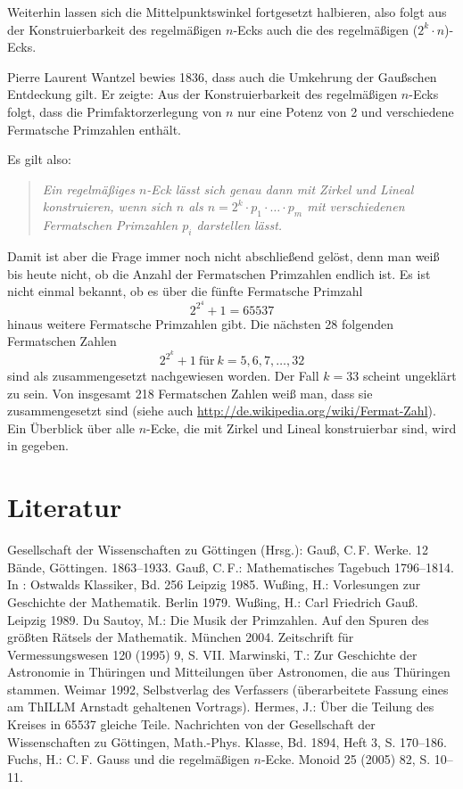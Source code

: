 \documentclass[10pt]{article}
\begin{document}
Weiterhin lassen sich die Mittelpunktswinkel fortgesetzt halbieren, also folgt
aus der Konstruierbarkeit des regelmäßigen $n$-Ecks auch die des  regelmäßigen
($2^k\cdot n$)-Ecks.

Pierre Laurent Wantzel bewies 1836, dass auch die Umkehrung der Gaußschen
Entdeckung gilt. Er zeigte: Aus der Konstruierbarkeit des
regelmäßigen $n$-Ecks folgt, dass die Primfaktorzerlegung von $n$ nur eine
Potenz von 2 und verschiedene Fermatsche Primzahlen enthält.

Es gilt also:
\begin{quote}\em
  Ein  regelmäßiges $n$-Eck lässt sich genau dann mit Zirkel und Lineal
  konstruieren, wenn sich $n$ als $n=2^k\cdot p_1\cdot\ldots\cdot p_m$ mit
  verschiedenen Fermatschen Primzahlen $p_i$ darstellen lässt.
\end{quote}

Damit ist aber die Frage immer noch nicht abschließend gelöst, denn man weiß
bis heute nicht, ob die Anzahl der Fermatschen Primzahlen endlich ist. Es ist
nicht einmal bekannt, ob es über die fünfte Fermatsche Primzahl
\[2^{2^4}+1=65537\]
hinaus weitere Fermatsche Primzahlen gibt. Die nächsten 28 folgenden
Fermatschen Zahlen
\[2^{2^k}+1\ \text{für}\ k=5,6,7,\dots,32\]
sind als zusammengesetzt nachgewiesen worden. Der Fall $k = 33$ scheint
ungeklärt zu sein. Von insgesamt 218 Fermatschen Zahlen weiß man, dass sie
zusammengesetzt sind (siehe auch
\url{http://de.wikipedia.org/wiki/Fermat-Zahl}). Ein Überblick über alle
$n$-Ecke, die mit Zirkel und Lineal konstruierbar sind, wird in \cite{Fuchs}
gegeben.

\section{Literatur}

\begin{thebibliography}{xxx}
 Gesellschaft der Wissenschaften zu Göttingen (Hrsg.): Gauß,
  C.\,F. Werke. 12 Bände, Göttingen. 1863--1933.
 Gauß, C.\,F.: Mathematisches Tagebuch 1796--1814. In :
  Ostwalds Klassiker, Bd. 256 Leipzig 1985.
 Wußing, H.: Vorlesungen zur Geschichte der Mathematik. Berlin
  1979. 
 Wußing, H.: Carl Friedrich Gauß. Leipzig 1989.
 Du Sautoy, M.: Die Musik der Primzahlen. Auf den Spuren des
  größten Rätsels der Mathematik. München 2004.
 Zeitschrift für Vermessungswesen 120 (1995) 9, S. VII.
 Marwinski, T.: Zur Geschichte der Astronomie in Thüringen und
  Mitteilungen über Astronomen, die aus Thüringen stammen. Weimar 1992,
  Selbstverlag des Verfassers (überarbeitete Fassung eines am ThILLM Arnstadt
  gehaltenen Vortrags).
 Hermes, J.: Über die Teilung des Kreises in 65537 gleiche Teile.
  Nachrichten von der Gesellschaft der Wissenschaften zu Göttingen,
  Math.-Phys. Klasse, Bd. 1894, Heft 3, S. 170--186.
 Fuchs, H.: C.\,F. Gauss und die regelmäßigen $n$-Ecke. Monoid
  25 (2005) 82, S. 10--11.
\end{thebibliography}
\end{document}
